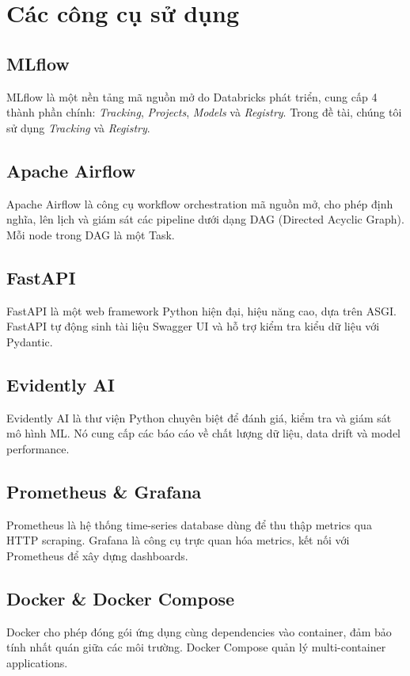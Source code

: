\documentclass[12pt,a4paper]{report}
\begin{document}
\section{Các công cụ sử dụng}

\subsection{MLflow}
MLflow là một nền tảng mã nguồn mở do Databricks phát triển, cung cấp 4 thành phần chính: \textit{Tracking}, \textit{Projects}, \textit{Models} và \textit{Registry}. Trong đề tài, chúng tôi sử dụng \textit{Tracking} và \textit{Registry}.

\subsection{Apache Airflow}
Apache Airflow là công cụ workflow orchestration mã nguồn mở, cho phép định nghĩa, lên lịch và giám sát các pipeline dưới dạng DAG (Directed Acyclic Graph). Mỗi node trong DAG là một Task.

\subsection{FastAPI}
FastAPI là một web framework Python hiện đại, hiệu năng cao, dựa trên ASGI. FastAPI tự động sinh tài liệu Swagger UI và hỗ trợ kiểm tra kiểu dữ liệu với Pydantic.

\subsection{Evidently AI}
Evidently AI là thư viện Python chuyên biệt để đánh giá, kiểm tra và giám sát mô hình ML. Nó cung cấp các báo cáo về chất lượng dữ liệu, data drift và model performance.

\subsection{Prometheus \& Grafana}
Prometheus là hệ thống time-series database dùng để thu thập metrics qua HTTP scraping. Grafana là công cụ trực quan hóa metrics, kết nối với Prometheus để xây dựng dashboards.

\subsection{Docker \& Docker Compose}
Docker cho phép đóng gói ứng dụng cùng dependencies vào container, đảm bảo tính nhất quán giữa các môi trường. Docker Compose quản lý multi-container applications.
\end{document}
